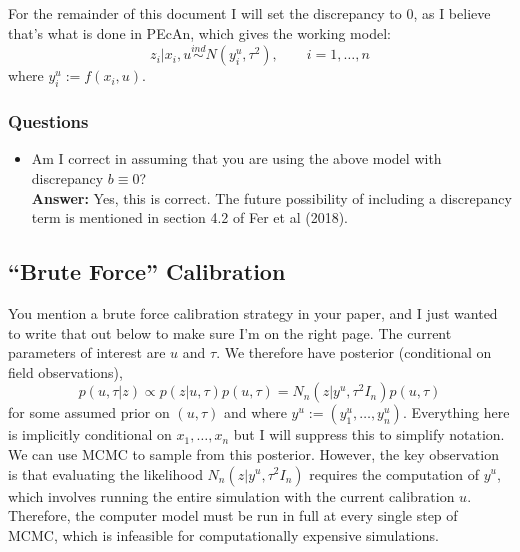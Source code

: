\documentclass[12pt]{article}
\begin{document}
For the remainder of this document I will set the discrepancy to $0$, as I believe that's what is done in PEcAn, which gives the working model: 
\[z_i|x_i, u \overset{ind}{\sim} N(y_i^u, \tau^2), \qquad i = 1, \dots, n \]
where $y_i^u := f(x_i, u)$. 

\subsubsection{Questions}
\begin{itemize}
\item Am I correct in assuming that you are using the above model with discrepancy $b \equiv 0$? \\
\textbf{Answer: } Yes, this is correct. The future possibility of including a discrepancy term is mentioned in section 4.2 of Fer et al (2018). 
\end{itemize}

\subsection{``Brute Force'' Calibration}
You mention a brute force calibration strategy in your paper, and I just wanted to write that out below to make sure I'm on the right page. The current parameters of interest are
$u$ and $\tau$. We therefore have posterior (conditional on field observations), 
\[p(u, \tau|z) \propto p(z|u, \tau)p(u, \tau) = N_n(z|y^u, \tau^2 I_n)p(u, \tau)\]
for some assumed prior on $(u, \tau)$ and where $y^u := (y_1^u, \dots, y_n^u)$. Everything here is implicitly conditional on $x_1, \dots, x_n$ but I will suppress this to simplify notation. 
We can use MCMC to sample from this posterior. However, the key observation is that evaluating the likelihood $N_n(z|y^u, \tau^2 I_n)$ requires the computation of $y^u$, which 
involves running the entire simulation with the current calibration $u$. Therefore, the computer model must be run in full at every single step of MCMC, 
which is infeasible for computationally expensive simulations. 
\end{document}
